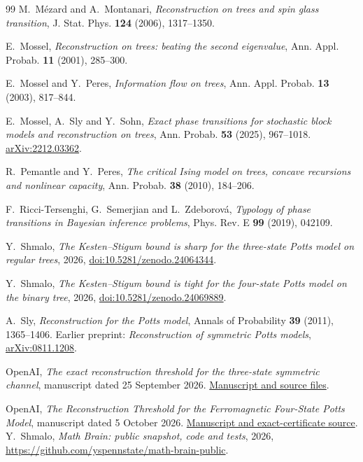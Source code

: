 \documentclass[11pt,reqno]{amsart}
\theoremstyle{definition}
\theoremstyle{remark}
\begin{document}
\begin{thebibliography}{99}
M.~M\'ezard and A.~Montanari, \emph{Reconstruction on trees and spin glass transition}, J. Stat. Phys. \textbf{124} (2006), 1317--1350.

E.~Mossel, \emph{Reconstruction on trees: beating the second eigenvalue}, Ann. Appl. Probab. \textbf{11} (2001), 285--300.

E.~Mossel and Y.~Peres, \emph{Information flow on trees}, Ann. Appl. Probab. \textbf{13} (2003), 817--844.

E.~Mossel, A.~Sly and Y.~Sohn, \emph{Exact phase transitions for stochastic block models and reconstruction on trees}, Ann. Probab. \textbf{53} (2025), 967--1018. \href{https://arxiv.org/abs/2212.03362}{arXiv:2212.03362}.

R.~Pemantle and Y.~Peres, \emph{The critical Ising model on trees, concave recursions and nonlinear capacity}, Ann. Probab. \textbf{38} (2010), 184--206.

F.~Ricci-Tersenghi, G.~Semerjian and L.~Zdeborov\'a, \emph{Typology of phase transitions in Bayesian inference problems}, Phys. Rev. E \textbf{99} (2019), 042109.

Y.~Shmalo, \emph{The Kesten--Stigum bound is sharp for the three-state Potts model on regular trees}, 2026, \href{https://doi.org/10.5281/zenodo.24064344}{doi:10.5281/zenodo.24064344}.

Y.~Shmalo, \emph{The Kesten--Stigum bound is tight for the four-state Potts model on the binary tree}, 2026, \href{https://doi.org/10.5281/zenodo.24069889}{doi:10.5281/zenodo.24069889}.

A.~Sly, \emph{Reconstruction for the Potts model}, Annals of Probability \textbf{39} (2011), 1365--1406. Earlier preprint: \emph{Reconstruction of symmetric Potts models}, \href{https://arxiv.org/abs/0811.1208}{arXiv:0811.1208}.

OpenAI, \emph{The exact reconstruction threshold for the three-state symmetric channel}, manuscript dated 25 September 2026.
\href{https://github.com/openai/math/tree/1581d4cbdd69a0faf34b2089614fe2a814316a6a/preprints/The-exact-reconstruction-threshold-for-the-three-state-symmetric-channel-September-25-2026}{Manuscript and source files}.

OpenAI, \emph{The Reconstruction Threshold for the Ferromagnetic Four-State Potts Model}, manuscript dated 5 October 2026.
\href{https://github.com/openai/math/tree/1581d4cbdd69a0faf34b2089614fe2a814316a6a/preprints/The-Reconstruction-Threshold-for-the-Ferromagnetic-Four-State-Potts-Model-October-5-2026}{Manuscript and exact-certificate source}.
 Y.~Shmalo, \emph{Math Brain: public snapshot, code and tests}, 2026, \url{https://github.com/yspennstate/math-brain-public}.


\end{thebibliography}
\end{document}
